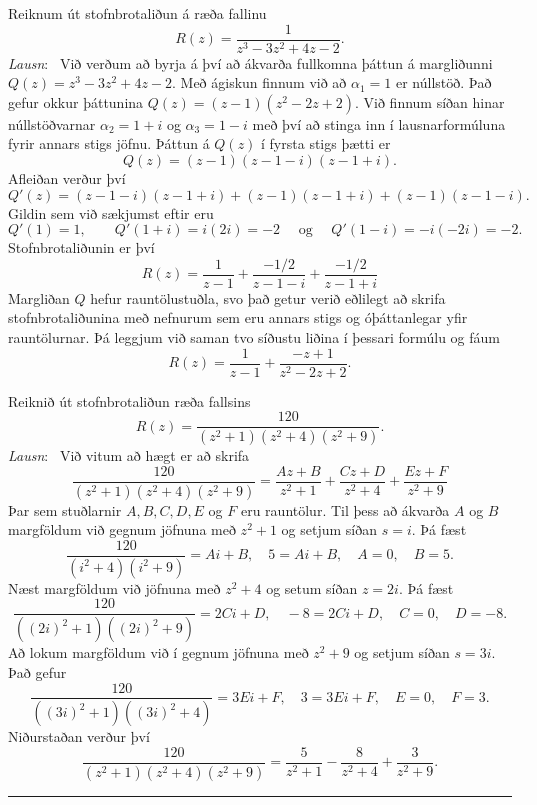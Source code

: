 \begin{sy} Reiknum út stofnbrotaliðun á ræða fallinu
$$
R(z)=\dfrac{1}{z^3-3z^2+4z-2}.
$$
{\it Lausn}: \  Við verðum að byrja á því að ákvarða fullkomna þáttun
á margliðunni $Q(z)=z^3-3z^2+4z-2$.  Með ágiskun finnum við að
$\alpha_1=1$ er
núllstöð.  Það gefur okkur þáttunina $Q(z)=(z-1)(z^2-2z+2)$.  Við
finnum síðan hinar núllstöðvarnar $\alpha_2=1+i$ og $\alpha_3=1-i$ með
því að stinga inn í lausnarformúluna fyrir annars stigs jöfnu.  Þáttun
á $Q(z)$ í fyrsta stigs þætti er 
$$
Q(z)=(z-1)(z-1-i)(z-1+i).
$$
Afleiðan verður því 
$$
Q'(z)=(z-1-i)(z-1+i)+(z-1)(z-1+i)+(z-1)(z-1-i).
$$
Gildin sem við sækjumst eftir eru
$$
Q'(1)=1, \qquad Q'(1+i)=i(2i)=-2 \quad \text{ og } \quad
Q'(1-i)=-i(-2i)=-2.
$$
Stofnbrotaliðunin er því
$$
R(z)=\dfrac 1{z-1}+\dfrac {-1/2}{z-1-i}+\dfrac {-1/2}{z-1+i}
$$
Margliðan $Q$ hefur rauntölustuðla, svo það getur verið eðlilegt að
skrifa stofnbrotaliðunina með nefnurum sem eru annars stigs og 
óþáttanlegar yfir rauntölurnar.  Þá leggjum við saman tvo síðustu
liðina í þessari formúlu og fáum
$$
R(z)=\dfrac 1{z-1}+\dfrac {-z+1}{z^2-2z+2}.
$$
\end{sy}



\begin{sy}  Reiknið út stofnbrotaliðun ræða fallsins
$$
R(z)=\dfrac {120}{(z^2+1)(z^2+4)(z^2+9)}.
$$
{\it Lausn}: \ Við vitum að  hægt er að skrifa
 $$\dfrac {120}{(z^2+1)(z^2+4)(z^2+9)}=
\dfrac {Az+B}{z^2+1} +\dfrac {Cz+D}{z^2+4}+\dfrac {Ez+F}{z^2+9}
 $$
Þar sem stuðlarnir $A,B,C,D,E$ og $F$ eru rauntölur.
Til þess að ákvarða $A$ og $B$ margföldum við gegnum jöfnuna með
$z^2+1$ og setjum síðan $s=i$. Þá fæst
 $$\dfrac {120}{(i^2+4)(i^2+9)}= Ai+B, 
\quad 5=Ai+B, \quad A=0, \quad B=5.
 $$
Næst margföldum við jöfnuna með $z^2+4$ og setum síðan $z=2i$.  Þá
fæst
 $$\dfrac {120}{((2i)^2+1)((2i)^2+9)}= 2Ci+D, 
\quad -8=2Ci+D, \quad C=0, \quad D=-8.
 $$
Að lokum margföldum við í gegnum jöfnuna með $z^2+9$ og setjum síðan
$s=3i$.   Það gefur
 $$\dfrac {120}{((3i)^2+1)((3i)^2+4)}= 3Ei+F, 
\quad 3=3Ei+F, \quad E=0, \quad F=3.
 $$
Niðurstaðan verður því 
 $$\dfrac {120}{(z^2+1)(z^2+4)(z^2+9)}=
\dfrac {5}{z^2+1} -\dfrac {8}{z^2+4}+\dfrac{3}{z^2+9}.
 $$
\end{sy}

\bigskip\hrule\bigskip

